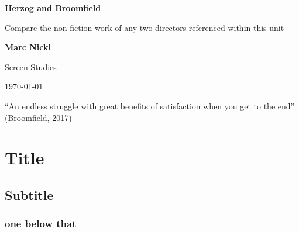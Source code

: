 \documentclass[
  12pt,
]{book}
\author{}
\date{}
\begin{document}
\frontmatter

\listoffigures
{}
\mainmatter
{}

\begin{titlepage}
    \begin{center}
        \vspace*{4cm}
            
  \LARGE
        \textbf{Herzog and Broomfield}
            
 \vspace{0.5cm}
        \Large
        Compare the non-fiction work of any two directors referenced within this unit
            
   \vspace{10cm}
            
\textbf{Marc Nickl}
            
\vfill
            
            
 \vspace{0.8cm}
                        
   \large
        Screen Studies 
        
\today
            
 \end{center}
\end{titlepage}

\setcounter{tocdepth}{3}
\tableofcontents
\pagebreak

\vspace{20pt}

\begin{center}
“An endless struggle with great benefits of satisfaction when you get to the end” (Broomfield, 2017)

\end{center}

\vspace{20pt}

\hypertarget{title}{%
\section{Title}\label{title}}

\hypertarget{subtitle}{%
\subsection{Subtitle}\label{subtitle}}

\hypertarget{one-below-that}{%
\subsubsection{one below that}\label{one-below-that}}
\end{document}
